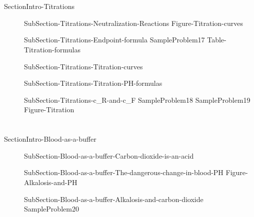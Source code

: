 \documentclass[main.tex]{subfiles}
\begin{document}
\section{\color{blue!30!black}{Titrations}}{SectionIntro-Titrations}
\sloppy
\begin{description}
\item[] {SubSection-Titrations-Neutralization-Reactions}
  {Figure-Titration-curves}

\item[] {SubSection-Titrations-Endpoint-formula}
  {SampleProblem17}
     {Table-Titration-formulas}

\item[] {SubSection-Titrations-Titration-curves}
 
   
\item[] 
{SubSection-Titrations-Titration-PH-formulas}
\item[] 
{SubSection-Titrations-c_R-and-c_F}
   {SampleProblem18}
  {SampleProblem19}
  {Figure-Titration}
\end{description}


\newpage
\section{\color{blue!30!black}{Blood as a buffer}}{SectionIntro-Blood-as-a-buffer}
\sloppy
\begin{description}
\item[] {SubSection-Blood-as-a-buffer-Carbon-dioxide-is-an-acid}
\item[] 
{SubSection-Blood-as-a-buffer-The-dangerous-change-in-blood-PH}
  {Figure-Alkalosis-and-PH}
\item[] 
{SubSection-Blood-as-a-buffer-Alkalosis-and-carbon-dioxide}
   {SampleProblem20}
 \end{description}
 
\end{document}
